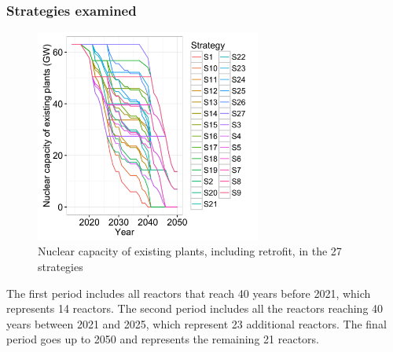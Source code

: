 \clearpage

\subsubsection{Strategies examined}
\label{sec:strategies_examined}

\begin{figure}[!htp]
	\centering
	\includegraphics[height=7cm]{figures/strategies.png}
	\caption{Nuclear capacity of existing plants, including retrofit, in the 27 strategies}
	\label{fig:strategies}
\end{figure}

\clearpage

The first period includes all reactors that reach 40 years before 2021, which represents 14 reactors. The second period includes all the reactors reaching 40 years between 2021 and 2025, which represent 23 additional reactors. The final period goes up to 2050 and represents the remaining 21 reactors.

